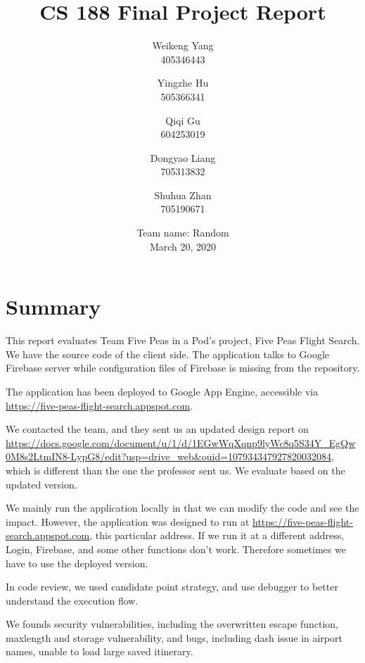 \documentclass[12pt, a4paper]{article}
\title{CS 188 Final Project Report}
\author{Weikeng Yang\\405346443 \and
Yingzhe Hu\\505366341 \and
Qiqi Gu\\604253019 \and
Dongyao Liang\\705313832 \and
Shuhua Zhan\\705190671}
\date{Team name: Random\\[2mm]March 20, 2020}
\newcommand{\code}[1]{\texttt{#1}}
\begin{document}
\maketitle

\tableofcontents
\newpage

\newcommand{\theproject}{Five Peas Flight Search}
\section{Summary}
This report evaluates Team Five Peas in a Pod's project, Five Peas Flight Search. We have the source code of the client side. The application talks to Google Firebase server while configuration files of Firebase is missing from the repository. %

The application has been deployed to Google App Engine, accessible via \url{https://five-peas-flight-search.appspot.com}. 

We contacted the team, and they sent us an updated design report on \url{https://docs.google.com/document/u/1/d/1EGwWqXqnp9lyWc8q5S34Y_EgQw0M8s2LtmIN8-LypG8/edit?usp=drive_web&ouid=107934347927820032084}, which is different than the one the professor sent us. We evaluate based on the updated version.

We mainly run the application locally in that we can modify the code and see the impact. However, the application was designed to run at \url{https://five-peas-flight-search.appspot.com}, this particular address. If we run it at a different address, Login, Firebase, and some other functions don't work. Therefore sometimes we have to use the deployed version.


In code review, we used candidate point strategy, and use debugger to better understand the execution flow. 

We founds security vulnerabilities, including the overwritten escape function, maxlength and storage vulnerability, and bugs, including dash issue in airport names, unable to load large saved itinerary.
\end{document}
